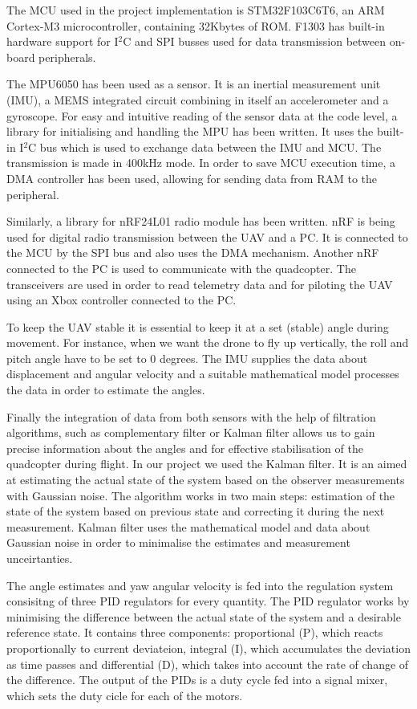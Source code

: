 {
The MCU used in the project implementation is STM32F103C6T6, an ARM Cortex-M3 microcontroller, containing 32Kbytes of ROM. F1303 has built-in hardware support for I$^2$C and SPI busses used for data transmission between on-board peripherals.

The MPU6050 has been used as a sensor. It is an inertial measurement unit (IMU), a MEMS integrated circuit combining in itself an accelerometer and a gyroscope. For easy and intuitive reading of the sensor data at the code level, a library for initialising and handling the MPU has been written. It uses the built-in I$^2$C bus which is used to exchange data between the IMU and MCU. The transmission is made in 400kHz mode. In order to save MCU execution time, a DMA controller has been used, allowing for sending data from RAM to the peripheral.

Similarly, a library for nRF24L01 radio module has been written. nRF is being used for digital radio transmission between the UAV and a PC. It is connected to the MCU by the SPI bus and also uses the DMA mechanism. Another nRF connected to the PC is used to communicate with the quadcopter. The transceivers are used in order to read telemetry data and for piloting the UAV using an Xbox controller connected to the PC.

To keep the UAV stable it is essential to keep it at a set (stable) angle during movement. For instance, when we want the drone to fly up vertically, the roll and pitch angle have to be set to 0 degrees. The IMU supplies the data about displacement and angular velocity and a suitable mathematical model processes the data in order to estimate the angles. 

Finally the integration of data from both sensors with the help of filtration algorithms, such as complementary filter or Kalman filter allows us to gain precise information about the angles and for effective stabilisation of the quadcopter during flight. In our project we used the Kalman filter. It is an aimed at estimating the actual state of the system based on the observer measurements with Gaussian noise. The algorithm works in two main steps: estimation of the state of the system based on previous state and correcting it during the next measurement. Kalman filter uses the mathematical model and data about Gaussian noise in order to minimalise the estimates and measurement unceirtanties. 

The angle estimates and yaw angular velocity is fed into the regulation system consisitng of three PID regulators for every quantity. 
The PID regulator works by minimising the difference between the actual state of the system and a desirable reference state. It contains three components: proportional (P), which reacts proportionally to current deviateion, integral (I), which accumulates the deviation as time passes and differential (D), which takes into account the rate of change of the difference. The output of the PIDs is a duty cycle fed into a signal mixer, which sets the duty cicle for each of the motors.
}